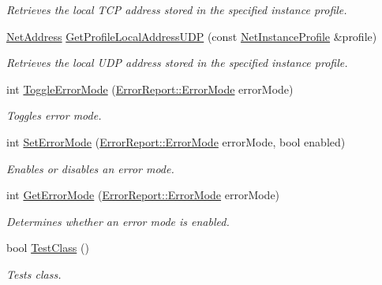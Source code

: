 \begin{DoxyCompactItemize}
\begin{DoxyCompactList}\small\item\em Retrieves the local TCP address stored in the specified instance profile. \item\end{DoxyCompactList}\item 
\hyperlink{class_net_address}{NetAddress} \hyperlink{namespacemn_a4ba287b3bb8e2f01357028db198d0249}{GetProfileLocalAddressUDP} (const \hyperlink{class_net_instance_profile}{NetInstanceProfile} \&profile)
\begin{DoxyCompactList}\small\item\em Retrieves the local UDP address stored in the specified instance profile. \item\end{DoxyCompactList}\item 
int \hyperlink{namespacemn_a0a01e895d4f298c3ed9481d1f544cfef}{ToggleErrorMode} (\hyperlink{class_error_report_ab70777b4cf64240281ddd4217664f683}{ErrorReport::ErrorMode} errorMode)
\begin{DoxyCompactList}\small\item\em Toggles error mode. \item\end{DoxyCompactList}\item 
int \hyperlink{namespacemn_af9e7e2b2efefe79f68bb72dca9212fd2}{SetErrorMode} (\hyperlink{class_error_report_ab70777b4cf64240281ddd4217664f683}{ErrorReport::ErrorMode} errorMode, bool enabled)
\begin{DoxyCompactList}\small\item\em Enables or disables an error mode. \item\end{DoxyCompactList}\item 
int \hyperlink{namespacemn_a282e7ed695df1c16ee6abad63175bf1d}{GetErrorMode} (\hyperlink{class_error_report_ab70777b4cf64240281ddd4217664f683}{ErrorReport::ErrorMode} errorMode)
\begin{DoxyCompactList}\small\item\em Determines whether an error mode is enabled. \item\end{DoxyCompactList}\item 
bool \hyperlink{namespacemn_aae72e4f0b526ae1d6b187c2bbe13dadc}{TestClass} ()
\begin{DoxyCompactList}\small\item\em Tests class. \item\end{DoxyCompactList}\end{DoxyCompactItemize}


